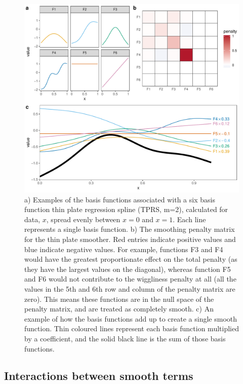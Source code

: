\documentclass[12pt]{article}
\begin{document}
\begin{figure}
\includegraphics[width=\linewidth]{../figures/basis_function_examples-1} \caption{\label{fig:basis_example}a) Examples of the basis functions associated with a six basis function thin plate regression spline (TPRS, m=2), calculated for data, $x$, spread evenly between $x=0$ and $x=1$. Each line represents a single basis function. b) The smoothing  penalty matrix for the thin plate smoother. Red entries indicate positive values and blue indicate negative values.  For example, functions F3 and F4 would have the greatest proportionate effect on the total penalty (as they have the largest values on the diagonal), whereas function F5 and F6 would not contribute to the wiggliness penalty at all (all the values in the 5th and 6th row and column of the penalty matrix are zero). This means these functions are in the null space of the penalty matrix, and are treated as completely smooth. c) An example of how the basis functions add up to create a single smooth function. Thin coloured lines represent each basis function multiplied by a coefficient, and the solid black line is the sum of those basis functions.}\label{fig:basis_function_examples}
\end{figure}

\subsection{Interactions between smooth
terms}\label{interactions-between-smooth-terms}
\end{document}
